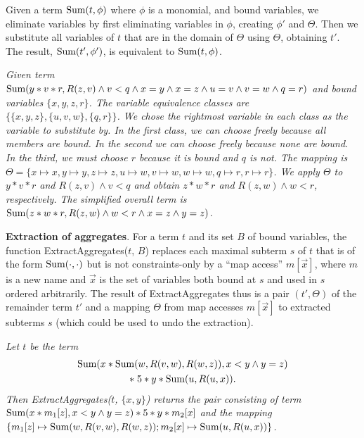 Given a term $\mbox{Sum}(t,\phi)$ where $\phi$ is a monomial,
and bound variables, we eliminate variables by 
first eliminating variables in $\phi$, creating $\phi'$ and $\Theta$.
Then we substitute all variables of $t$ that are in the domain of $\Theta$
using $\Theta$, obtaining $t'$. The result, $\mbox{Sum}(t', \phi')$, is equivalent
to $\mbox{Sum}(t,\phi)$.


\begin{example} \em
Given term $\mbox{Sum}(y*v*r, R(z, v) \land v<q
\land x=y \land x=z \land u=v \land v=w \land q=r)$
and bound variables $\{x,y,z,r\}$.
The variable equivalence classes are
$\{ \{x,y,z\}, \{u,v,w\}, \{q,r\} \}$. We chose the rightmost variable in
each class as the variable to substitute by. In the first class, we can choose
freely because all members are bound. In the second we can choose freely
because none are bound. In the third, we must choose $r$ because it is bound
and $q$ is not.
The mapping is
$\Theta = \{ x \mapsto x, y \mapsto y, z \mapsto z, u \mapsto w, v \mapsto w,
w \mapsto w, q \mapsto r, r \mapsto r \}$.
We apply $\Theta$ to $y*v*r$ and $R(z, v) \land v < q$ and obtain
$z*w*r$ and $R(z,w) \land w<r$, respectively. The simplified
overall term is
$\mbox{Sum}(z*w*r, R(z,w) \land w<r \land x=z \land y=z)$.
\punto
\end{example}


{\bf Extraction of aggregates}.
For a term $t$ and its set $B$ of bound variables,
the function ExtractAggregates($t$, $B$)
replaces each maximal subterm $s$ of $t$
that is of the form $\mbox{Sum}(\cdot, \cdot)$ but is not constraints-only
by a ``map access''  $m[\vec{x}]$, where
$m$ is a new name and $\vec{x}$ is the set of variables
both bound at $s$ and used in $s$ ordered arbitrarily.
The result of ExtractAggregates thus is a pair $(t', \Theta)$ of the remainder
term $t'$ and a mapping $\Theta$ from map accesses $m[\vec{x}]$ to extracted
subterms $s$ (which could be used to undo the extraction).

\begin{example}\em
Let $t$ be the term
\begin{multline*}
\mbox{Sum}(x*\mbox{Sum}(w, R(v, w), R(w, z)), x<y \land y=z) \\
*\; 5 * y * \mbox{Sum}(u, R(u, x)).
\end{multline*}
Then ExtractAggregates($t$, $\{x,y\}$) returns the pair consisting of term
$\mbox{Sum}(x*m_1[z], x<y \land y=z) * 5 * y * m_2[x]$
and the mapping
$\{
m_1[z] \mapsto \mbox{Sum}(w, R(v, w), R(w, z));
m_2[x] \mapsto \mbox{Sum}(u, R(u, x))
\}$.
\punto
\end{example}


